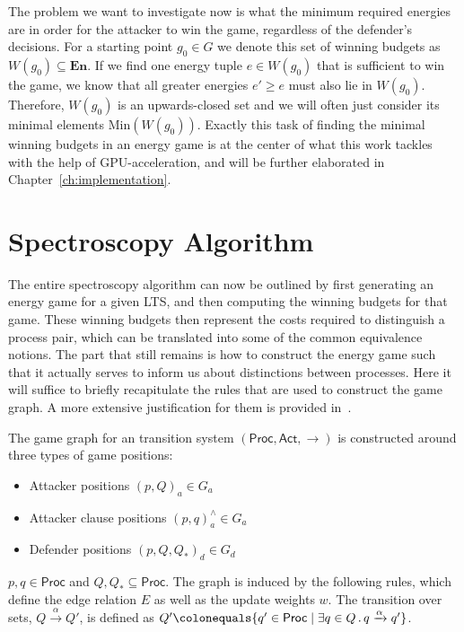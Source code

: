 The problem we want to investigate now is
what the minimum required energies are
in order for the attacker to win the game,
regardless of the defender's decisions.
For a starting point $g_0 \in G$ we denote this set of winning budgets as
$W(g_0) \subseteq \mathbf{En}$.
If we find one energy tuple $e \in W(g_0)$ that is sufficient to win the game,
we know that all greater energies $e' \geq e$ must also lie in $W(g_0)$.
Therefore, $W(g_0)$ is an upwards-closed set and we will often just consider
its minimal elements $\mathrm{Min}(W(g_0))$.
Exactly this task of finding the minimal winning budgets in an energy game
is at the center of what this work tackles with the help of GPU-acceleration,
and will be further elaborated in Chapter~\ref{ch:implementation}.


\section{Spectroscopy Algorithm}\label{sec:spectroscopy}

The entire spectroscopy algorithm can now be outlined by
first generating an energy game for a given LTS,
and then computing the winning budgets for that game.
These winning budgets then represent the costs required to distinguish a
process pair,
which can be translated into some of the common equivalence notions.
The part that still remains is how to construct the energy game
such that it actually serves to inform us about distinctions between processes.
Here it will suffice to briefly recapitulate the rules that are used to
construct the game graph.
A more extensive justification for them is provided in~\cite{bisping2023process}.

The game graph for an transition system
$(\mathsf{Proc}, \mathsf{Act}, {\rightarrow})$
is constructed around three types of game positions:

\begin{itemize}
    \item Attacker positions ${(p, Q)}_a \in G_a$
    \item Attacker clause positions ${(p, q)}_a^{\scriptscriptstyle\land} \in G_a$
    \item Defender positions ${(p, Q, Q_*)}_d \in G_d$
\end{itemize}

$p, q \in \mathsf{Proc}$ and $Q, Q_* \subseteq \mathsf{Proc}$.
The graph is induced by the following rules,
which define the edge relation $E$ as well as the update weights $w$.
The transition over sets, $Q \xrightarrow{\alpha} Q'$,
is defined as
$Q' \colonequals \{q' \in \mathsf{Proc} \mid
    \exists q \in Q\,.\,q \xrightarrow{\alpha} q'\}$.



